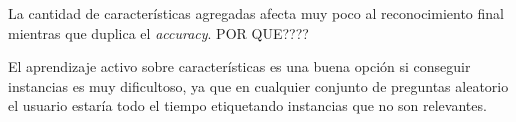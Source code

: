 La cantidad de características agregadas afecta muy poco al reconocimiento final mientras que duplica el \textit{accuracy}.  POR QUE????

El aprendizaje activo sobre características es una buena opción si conseguir instancias es muy dificultoso, ya que en cualquier conjunto de preguntas aleatorio el usuario estaría todo el tiempo etiquetando instancias que no son relevantes.







